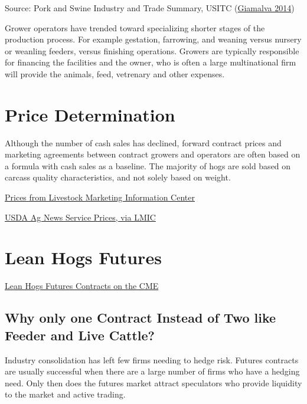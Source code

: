 \documentclass[
]{book}
\begin{document}
Source: Pork and Swine Industry and Trade Summary, USITC (\protect\hyperlink{ref-usitctrade}{Giamalva 2014})

Grower operators have trended toward specializing shorter stages of the production process. For example gestation, farrowing, and weaning versus nursery or weanling feeders, versus finishing operations. Growers are typically responsible for financing the facilities and the owner, who is often a large multinational firm will provide the animals, feed, vetrenary and other expenses.

\hypertarget{price-determination}{%
\section{Price Determination}\label{price-determination}}

Although the number of cash sales has declined, forward contract prices and marketing agreements between contract growers and operators are often based on a formula with cash sales as a baseline. The majority of hogs are sold based on carcass quality characteristics, and not solely based on weight.

\href{http://www.lmic.info/spreadsheet/prices-and-production}{Prices from Livestock Marketing Information Center}

\href{http://www.lmic.info/quick_market_reports/hogs}{USDA Ag News Service Prices, via LMIC}

\hypertarget{lean-hogs-futures}{%
\section{Lean Hogs Futures}\label{lean-hogs-futures}}

\href{http://www.cmegroup.com/trading/agricultural/livestock/lean-hogs.html}{Lean Hogs Futures Contracts on the CME}

\hypertarget{why-only-one-contract-instead-of-two-like-feeder-and-live-cattle}{%
\subsection{Why only one Contract Instead of Two like Feeder and Live Cattle?}\label{why-only-one-contract-instead-of-two-like-feeder-and-live-cattle}}

Industry consolidation has left few firms needing to hedge risk. Futures contracts are usually successful when there are a large number of firms who have a hedging need. Only then does the futures market attract speculators who provide liquidity to the market and active trading.
\end{document}

